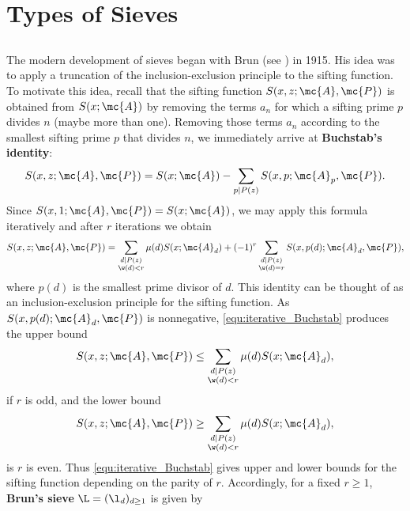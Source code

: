 \chapter{Types of Sieves}
  \section{}
    The modern development of sieves began with Brun (see \cite{brun1915uber}) in 1915. His idea was to apply a truncation of the inclusion-exclusion principle to the sifting function. To motivate this idea, recall that the sifting function $S(x,z;\mc{A},\mc{P})$ is obtained from $S(x;\mc{A})$ by removing the terms $a_{n}$ for which a sifting prime $p$ divides $n$ (maybe more than one). Removing those terms $a_{n}$ according to the smallest sifting prime $p$ that divides $n$, we immediately arrive at \textbf{Buchstab's identity}:
    \[
      S(x,z;\mc{A},\mc{P}) = S(x;\mc{A})-\sum_{p \mid P(z)}S(x,p;\mc{A}_{p},\mc{P}).
    \]
    Since $S(x,1;\mc{A},\mc{P}) = S(x;\mc{A})$, we may apply this formula iteratively and after $r$ iterations we obtain
    \begin{equation}\label{equ:iterative_Buchstab}
      S(x,z;\mc{A},\mc{P}) = \sum_{\substack{d \mid P(z) \\ \w(d) < r}}\mu(d)S(x;\mc{A}_{d})+(-1)^{r}\sum_{\substack{d \mid P(z) \\ \w(d) = r}}S(x,p(d);\mc{A}_{d},\mc{P}),
    \end{equation}
    where $p(d)$ is the smallest prime divisor of $d$. This identity can be thought of as an inclusion-exclusion principle for the sifting function. As $S(x,p(d);\mc{A}_{d},\mc{P})$ is nonnegative, \cref{equ:iterative_Buchstab} produces the upper bound
    \begin{equation}\label{equ:iterative_Buchstab_odd}
      S(x,z;\mc{A},\mc{P}) \le \sum_{\substack{d \mid P(z) \\ \w(d) < r}}\mu(d)S(x;\mc{A}_{d}),
    \end{equation}
    if $r$ is odd, and the lower bound
    \begin{equation}\label{equ:iterative_Buchstab_even}
      S(x,z;\mc{A},\mc{P}) \ge \sum_{\substack{d \mid P(z) \\ \w(d) < r}}\mu(d)S(x;\mc{A}_{d}),
    \end{equation}
    is $r$ is even. Thus \cref{equ:iterative_Buchstab} gives upper and lower bounds for the sifting function depending on the parity of $r$. Accordingly, for a fixed $r \ge 1$, \textbf{Brun's sieve} $\L = (\l_{d})_{d \ge 1}$ is given by
